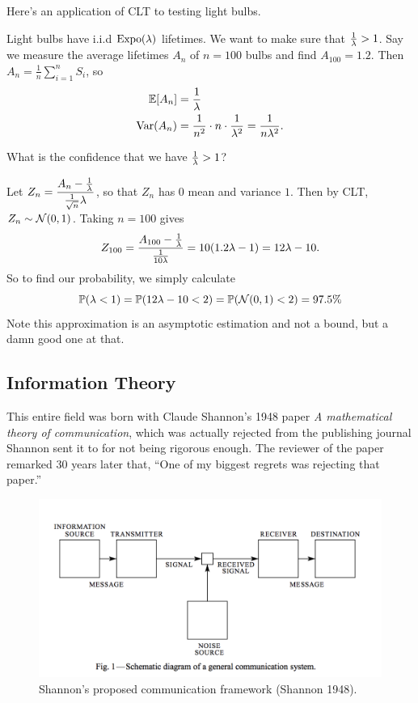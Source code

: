 \documentclass[11 pt]{scrartcl}
\begin{document}
Here's an application of CLT to testing light bulbs. 
\begin{example}
    Light bulbs have i.i.d $\text{Expo}(\lambda)$ lifetimes. We want to make sure that $\frac{1}{\lambda} > 1$. Say we measure the average lifetimes $A_n$ of $n = 100$ bulbs and find $A_{100} = 1.2$. Then $A_n = \frac{1}{n}\sum_{i=1}^n S_i$, so 
    \begin{align*}
        \mathbb E[A_n] &= \frac{1}{\lambda} \\ 
        \text{Var}(A_n) &= \frac{1}{n^2}\cdot n \cdot \frac{1}{\lambda^2} = \frac{1}{n\lambda^2}. 
    \end{align*}
    \begin{question}
        What is the confidence that we have $\frac{1}{\lambda} > 1$? 
    \end{question}
    Let $Z_n = \dfrac{A_n - \frac{1}{\lambda}}{\frac{1}{\sqrt{n}}\lambda}$, so that $Z_n$ has $0$ mean and variance $1$. Then by CLT, $Z_n\sim \mathcal{N}(0,1)$. Taking $n = 100$ gives 
    \[ Z_{100}  = \dfrac{A_{100} - \frac{1}{\lambda}}{\frac{1}{10\lambda}} = 10(1.2\lambda -1) = 12\lambda - 10.\] 
    So to find our probability, we simply calculate 
    \[ \mathbb P(\lambda < 1) = \mathbb P(12\lambda - 10 < 2) = \mathbb P(\mathcal{N}(0,1) < 2) = 97.5\%\] 
    Note this approximation is an asymptotic estimation and not a bound, but a damn good one at that. 
\end{example}

\subsection{Information Theory}
This entire field was born with Claude Shannon's 1948 paper \emph{A mathematical theory of communication}, which was actually rejected from the publishing journal Shannon sent it to for not being rigorous enough. The reviewer of the paper remarked 30 years later that, ``One of my biggest regrets was rejecting that paper.'' 


\begin{figure}[!ht]
    \centering
    \includegraphics[scale=0.8]{shannon_paper_fig.png}
\caption{Shannon's proposed communication framework (Shannon 1948).}
\end{figure}
\end{document}
